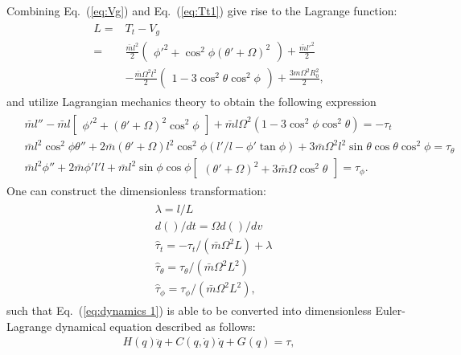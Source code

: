 \documentclass[Journal,letterpaper]{ascelike-new}
\theoremstyle{plain}
\theoremstyle{remark}
\begin{document}
Combining Eq.~(\ref{eq:Vg}) and Eq.~(\ref{eq:Tt1}) give rise to the Lagrange function:
\begin{align}
\begin{split}
L=&T_t-V_g\\
=&\frac{\bar ml^2}{2}\begin{pmatrix}\phi'^{2}+\cos^2\phi(\theta'+\Omega)^2\end{pmatrix}+\frac{\bar ml'^2}{2}\\
&-\frac{\bar m\Omega^2l^2}{2}\begin{pmatrix}1-3\cos^2\theta\cos^2\phi\end{pmatrix}+\frac{3m\Omega^2R_0^2}{2},
\end{split}
\end{align}
and utilize Lagrangian mechanics theory to obtain the following expression
\begin{align}
\begin{split}
&\bar m l''-\bar m l\begin{bmatrix}\phi'^2+(\theta'+\Omega)^2\cos^2\phi\end{bmatrix}+\bar m l\Omega^2(1-3\cos^2\phi\cos^2\theta)=-\tau_t\\
&\bar m l^2\cos^2\phi\theta''+2\bar m (\theta'+\Omega)l^2\cos^2\phi(l'/l-\phi'\tan\phi)+3\bar m \Omega^2l^2\sin\theta\cos\theta\cos^2\phi=\tau_\theta\\
&\bar m l^2\phi''+2\bar m \phi'l'l+\bar m l^2\sin\phi\cos\phi\begin{bmatrix}(\theta'+\Omega)^2+3\bar m \Omega\cos^2\theta\end{bmatrix}=\tau_\phi.\label{eq:dynamics 1}
\end{split}
\end{align}
One can construct the dimensionless transformation:
\begin{align}
\begin{split}
&\lambda=l/L\\
&d()/dt=\Omega d()/dv\\
&\hat{\tau}_t=-\tau_t/(\bar{m}\Omega^2L)+\lambda\\
&\hat{\tau}_\theta=\tau_\theta/(\bar{m}\Omega^2L^2)\\
&\hat{\tau}_\phi = \tau_\phi/(\bar{m}\Omega^2L^2)\label{eq:varcon},
\end{split}
\end{align}
such that Eq.~(\ref{eq:dynamics 1}) is able to be converted into dimensionless Euler-Lagrange dynamical equation described as follows:
\begin{align}
H(q)\ddot {q}+C(q,\dot{q})\dot{q}+G(q) = \tau,\label{eq:dynamic model}
\end{align}
\end{document}
